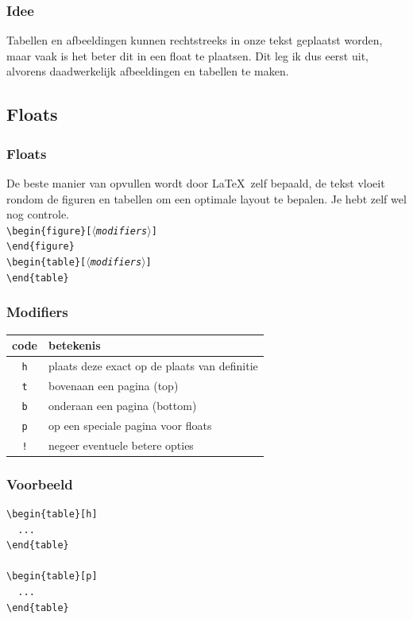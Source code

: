 \begin{frame}
  \frametitle{Idee}

  Tabellen en afbeeldingen kunnen rechtstreeks in onze tekst geplaatst worden, maar vaak is het beter dit in een float te plaatsen. Dit leg ik dus eerst uit, alvorens daadwerkelijk afbeeldingen en tabellen te maken.
\end{frame}

\subsection{Floats}
\begin{frame}
  \frametitle{Floats}

  De beste manier van opvullen wordt door \LaTeX\ zelf bepaald, de tekst vloeit rondom de figuren en tabellen om een optimale layout te bepalen. Je hebt zelf wel nog controle. \\[1em]

  \texttt{\textbackslash begin\{figure\}[$\langle$\textsl{modifiers}$\rangle$]} \\
  \texttt{\textbackslash end\{figure\}} \\[.5em]

  \texttt{\textbackslash begin\{table\}[$\langle$\textsl{modifiers}$\rangle$]} \\
  \texttt{\textbackslash end\{table\}}
\end{frame}

\begin{frame}
  \frametitle{Modifiers}

  \begin{tabular}{cl}
    code & betekenis \\\midrule
    \texttt{h} & plaats deze exact op de plaats van definitie \\
    \texttt{t} & bovenaan een pagina (top) \\
    \texttt{b} & onderaan een pagina (bottom) \\
    \texttt{p} & op een speciale pagina voor floats \\
    \texttt{!} & negeer eventuele betere opties
  \end{tabular}
\end{frame}

\begin{frame}[fragile]
  \frametitle{Voorbeeld}

  \begin{verbatim}
\begin{table}[h]
  ...
\end{table}

\begin{table}[p]
  ...
\end{table}
\end{verbatim}
\end{frame}

